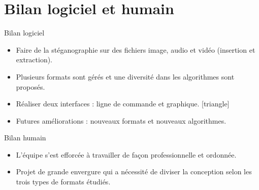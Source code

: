 \documentclass{beamer}
\begin{document}
  
  
  \section{Bilan logiciel et humain}
  
  \begin{frame}
  
	\begin{block}{Bilan logiciel}
	\begin{itemize}
	[circle]
	\item Faire de la stéganographie sur des fichiers image, audio et vidéo
	(insertion et extraction). \checkmark
	\item Plusieurs formats sont gérés et une diversité dans les algorithmes 
	sont proposés. \checkmark
	\item Réaliser deux interfaces : ligne de commande et graphique. \checkmark
{}[triangle]
	\item Futures améliorations : nouveaux formats et nouveaux algorithmes. 

\end{itemize}
	
	\end{block}
	
	\begin{block}{Bilan humain}
	\begin{itemize}
	[circle]
	\item L'équipe s'est efforcée à travailler de façon professionnelle et ordonnée.
	\item Projet de grande envergure qui a nécessité de diviser la conception 
	selon les trois types de formats étudiés.  
	\end{itemize}
	\end{block}

	\end{frame}
  
  
\end{document}
